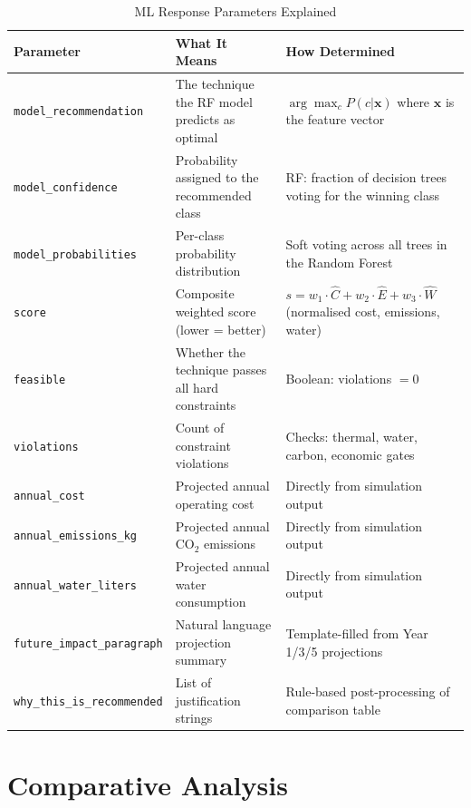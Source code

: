 \documentclass[12pt,a4paper]{report}
\begin{document}
\begin{table}[H]
\centering
\caption{ML Response Parameters Explained}
\label{tab:ml_params}
\renewcommand{\arraystretch}{1.3}
\scriptsize
\begin{tabular}{p{3.5cm}p{4.5cm}p{6.5cm}}
\toprule
\textbf{Parameter} & \textbf{What It Means} & \textbf{How Determined} \\
\midrule
\texttt{model\_recommendation} & The technique the RF model predicts as optimal & $\arg\max_c P(c | \mathbf{x})$ where $\mathbf{x}$ is the feature vector \\
\texttt{model\_confidence} & Probability assigned to the recommended class & RF: fraction of decision trees voting for the winning class \\
\texttt{model\_probabilities} & Per-class probability distribution & Soft voting across all trees in the Random Forest \\
\texttt{score} & Composite weighted score (lower = better) & $s = w_1 \cdot \hat{C} + w_2 \cdot \hat{E} + w_3 \cdot \hat{W}$ (normalised cost, emissions, water) \\
\texttt{feasible} & Whether the technique passes all hard constraints & Boolean: violations $= 0$ \\
\texttt{violations} & Count of constraint violations & Checks: thermal, water, carbon, economic gates \\
\texttt{annual\_cost} & Projected annual operating cost & Directly from simulation output \\
\texttt{annual\_emissions\_kg} & Projected annual CO$_2$ emissions & Directly from simulation output \\
\texttt{annual\_water\_liters} & Projected annual water consumption & Directly from simulation output \\
\texttt{future\_impact\_paragraph} & Natural language projection summary & Template-filled from Year 1/3/5 projections \\
\texttt{why\_this\_is\_recommended} & List of justification strings & Rule-based post-processing of comparison table \\
\bottomrule
\end{tabular}
\end{table}

\newpage

\chapter{Comparative Analysis}
\label{ch:compare}
\end{document}
